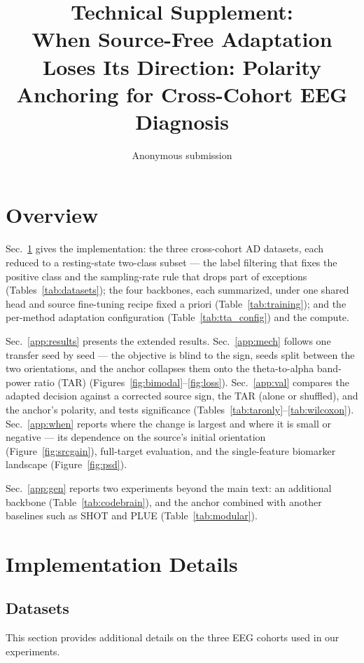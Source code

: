 \documentclass[letterpaper]{article} %
\title{Technical Supplement:\\When Source-Free Adaptation Loses Its Direction: Polarity Anchoring for Cross-Cohort EEG Diagnosis}
\author{Anonymous submission}
\begin{document}
\maketitle
\appendix
\setcounter{secnumdepth}{2}
\section*{Overview}

Sec.~\ref{app:impl} gives the implementation: the three cross-cohort AD datasets, each reduced to a resting-state two-class subset --- the label filtering that fixes the positive class and the sampling-rate rule that drops part of exceptions (Tables~\ref{tab:datasets}); the
four backbones, each summarized, under one shared head and source fine-tuning recipe fixed a priori (Table~\ref{tab:training}); and the per-method adaptation configuration (Table~\ref{tab:tta_config}) and the compute.

Sec.~\ref{app:results} presents the extended results. Sec.~\ref{app:mech} follows one transfer seed by seed --- the objective is blind to the sign, seeds split between the two orientations, and the anchor collapses them onto the theta-to-alpha band-power ratio (TAR) (Figures~\ref{fig:bimodal}--\ref{fig:loss}). Sec.~\ref{app:val} compares the adapted decision against a corrected source sign, the TAR (alone or shuffled), and the anchor's polarity, and tests significance (Tables~\ref{tab:taronly}--\ref{tab:wilcoxon}). Sec.~\ref{app:when} reports where the change is largest and where it is small or negative --- its dependence on the source's initial orientation (Figure~\ref{fig:srcgain}), full-target evaluation, and the single-feature biomarker landscape (Figure~\ref{fig:psd}).


Sec.~\ref{app:gen} reports two experiments beyond the main text: an additional backbone (Table~\ref{tab:codebrain}), and the anchor combined with another baselines such as SHOT and PLUE (Table~\ref{tab:modular}).






\section{Implementation Details}\label{app:impl}
\subsection{Datasets}
This section provides additional details on the three EEG cohorts used in our experiments.
\end{document}
